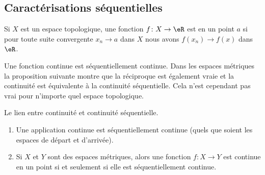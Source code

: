\subsection{Caractérisations séquentielles}

\begin{definition}  \label{DefENioICV}
    Si \( X\) est un espace topologique, une fonction \( f\colon X\to \eR\) est  en un point \( a\) si pour toute suite convergente \( x_n\to a\) dans \( X\) nous avons \( f(x_n)\to f(x)\) dans \( \eR\).
\end{definition}


Une fonction continue est séquentiellement continue. Dans les espaces métriques la proposition suivante montre que la réciproque est également vraie et la continuité est équivalente à la continuité séquentielle. Cela n'est cependant pas vrai pour n'importe quel espace topologique.

\begin{proposition}		\label{PropFnContParSuite}
    Le lien entre continuité et continuité séquentielle.

    \begin{enumerate}
        \item
    Une application continue est séquentiellement continue (quels que soient les espaces de départ et d'arrivée).

\item\label{ItemWJHIooMdugfu}
    
    Si \( X\) et \( Y\) sont des espaces métriques, alors une fonction \( f\colon X\to Y\) est continue en un point si et seulement si elle est séquentiellement continue.
    \end{enumerate}
\end{proposition}

